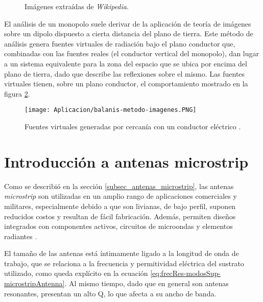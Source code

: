 \begin{figure}[H]
	\centering 
	\hspace{30pt}
	\caption{Imágenes extraídas de \textit{Wikipedia}.}
	\label{fig:monopolos}
\end{figure}


El análisis de un monopolo suele derivar de la aplicación de teoría de imágenes sobre un dipolo dispuesto a cierta distancia del plano de tierra. Este método de análisis genera fuentes virtuales de radiación bajo el plano conductor que, combinadas con las fuentes reales (el conductor vertical del monopolo), dan lugar a un sistema equivalente para la zona del espacio que se ubica por encima del plano de tierra, dado que describe las reflexiones sobre el mismo. Las fuentes virtuales tienen, sobre un plano conductor, el comportamiento mostrado en la figura \ref{fig:fuentes-virtuales}.


\begin{figure}[h]
	\centering
	\texttt{[image: Aplicacion/balanis-metodo-imagenes.PNG]}
	\caption{Fuentes virtuales generadas por cercanía con un conductor eléctrico \cite{Balanis:Theory}.}
	\label{fig:fuentes-virtuales}
\end{figure}

\section{Introducción a antenas microstrip}

Como se describió en la sección \ref{subsec_antenas_microstrip}, las antenas \textit{microstrip} son utilizadas en un amplio rango de aplicaciones comerciales y militares, especialmente debido a que son livianas, de bajo perfil, suponen reducidos costos y resultan de fácil fabricación. Además, permiten diseños integrados con componentes activos, circuitos de microondas y elementos radiantes \cite{Yang:EBGAntennas}.

El tamaño de las antenas está íntimamente ligado a la longitud de onda de trabajo, que se relaciona a la frecuencia y permitividad eléctrica del sustrato utilizado, como queda explícito en la ecuación \ref{eq:frecRes-modosSup-microstripAntenna}. Al mismo tiempo, dado que en general son antenas resonantes, presentan un alto Q, lo que afecta a su ancho de banda.

